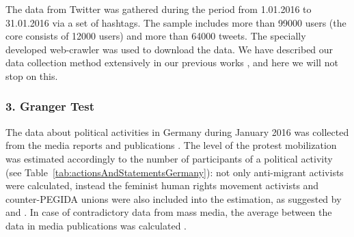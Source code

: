 The data from Twitter was gathered during the period from 1.01.2016 to 31.01.2016 via a set of hashtags. The sample includes more than 99000 users (the core consists of 12000 users) and more than 64000 tweets. The specially developed web-crawler was used to download the data. We have described our data collection method extensively in our previous works \cite{BodrunovaBlekanovMaksimov,BodrunovaLitvinenkoBlekanov}, and here we will not stop on this.

\subsubsection{3. Granger Test}

The data about political activities in Germany during January 2016 was collected from the media reports and publications \cite{KoopmansRucht}. The level of the protest mobilization was estimated accordingly to the number of participants of a political activity (see Table~\cref{tab:actionsAndStatementsGermany}): not only anti-migrant activists were calculated, instead the feminist human rights movement activists and counter-PEGIDA unions were also included into the estimation, as suggested by \cite{BastosMerceaCharperntier} and \cite{Castells}. In case of contradictory data from mass media, the average between the data in media publications was calculated \cite{BastosMerceaCharperntier}.

